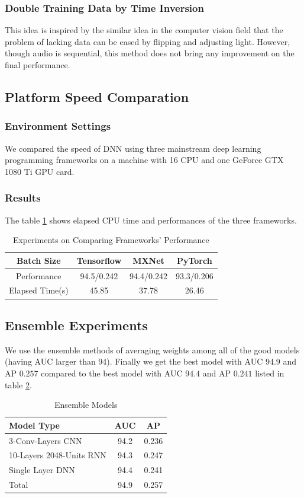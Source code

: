 \documentclass{article}
\begin{document}
			\subsubsection*{Double Training Data by Time Inversion}
				This idea is inspired by the similar idea in the computer vision field that the problem of lacking data can be eased by flipping and adjusting light. However, though audio is sequential, this method does not bring any improvement on the final performance.
		\subsection{Platform Speed Comparation}
			\subsubsection*{Environment Settings}
				We compared the speed of DNN using three mainstream deep learning programming frameworks on a machine with 16 CPU and one GeForce GTX 1080 Ti GPU card.
			\subsubsection*{Results}
				The table \ref{table:performance} shows elapsed CPU time and performances of the three frameworks.
				\begin{table}[htbp]
					\centering
					\begin{tabular}{c|ccc}
						\hline
						\hline
						 Batch Size      & Tensorflow & MXNet & PyTorch\\
						\hline
						    Performance  &   94.5/0.242 & 94.4/0.242 & 93.3/0.206 \\
						    Elapsed Time(s) & 45.85  & 37.78  & 26.46 \\
						\hline
					\end{tabular}
					\caption{\label{table:performance}Experiments on Comparing Frameworks' Performance}
				\end{table}
		\subsection{Ensemble Experiments}
			We use the ensemble methods of averaging weights among all of the good models (having AUC larger than 94). Finally we get the best model with AUC $94.9$ and AP $0.257$ compared to the best model with AUC $94.4$ and AP $0.241$ listed in table \ref{table:ensemble}.
			\begin{table}[htbp]
					\centering
					\begin{tabular}{l|cc}
						\hline
						\hline
						 Model Type  & AUC & AP\\
						\hline
						  3-Conv-Layers CNN           &  94.2 & 0.236 \\
						  10-Layers 2048-Units RNN    &  94.3 & 0.247 \\
						  Single Layer DNN            &  94.4 & 0.241 \\
						\hline
						  Total                       &  94.9 & 0.257 \\
						\hline
					\end{tabular}
					\caption{\label{table:ensemble}Ensemble Models}
				\end{table}
\end{document}
